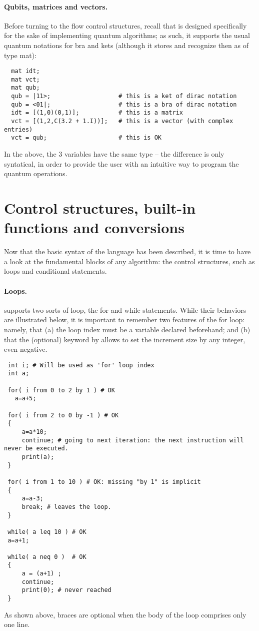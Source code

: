 \paragraph{Qubits, matrices and vectors.} Before turning to the flow control structures, recall that \QL is designed specifically for the sake of implementing quantum algorithms; as such, it supports the usual quantum notations for bra and kets (although it stores and recognize then as of type \textsf{mat}):
\begin{lstlisting}
  mat idt;
  mat vct;
  mat qub;
  qub = |11>;                   # this is a ket of dirac notation
  qub = <01|;                   # this is a bra of dirac notation
  idt = [(1,0)(0,1)];           # this is a matrix
  vct = [(1,2,C(3.2 + 1.I))];   # this is a vector (with complex entries)
  vct = qub;                    # this is OK
\end{lstlisting}
In the above, the 3 variables have the same type -- the difference is only syntatical, in order to provide the user with an intuitive way to program the quantum operations.


\section{Control structures, built-in functions and conversions}
Now that the basic syntax of the language has been described, it is time to have a look at the fundamental blocks of any algorithm: the control structures, such as loops and conditional statements. 

\paragraph{Loops.} \QL supports two sorts of loop, the \textsf{for} and \textsf{while} statements. While their behaviors are illustrated below, it is important to remember two features of the \textsf{for} loop: namely, that \textsf{(a)} the loop index must be a variable declared beforehand; and \textsf{(b)} that the (optional) keyword \textsf{by} allows to set the increment size by any integer, even negative.

\begin{lstlisting}
 int i; # Will be used as 'for' loop index
 int a;

 for( i from 0 to 2 by 1 ) # OK
   a=a+5;

 for( i from 2 to 0 by -1 ) # OK
 {
     a=a*10;
     continue; # going to next iteration: the next instruction will never be executed.
     print(a);
 }
 
 for( i from 1 to 10 ) # OK: missing "by 1" is implicit
 {
     a=a-3;
     break; # leaves the loop.
 }
 
 while( a leq 10 ) # OK
 a=a+1;
 
 while( a neq 0 )  # OK
 {
     a = (a+1) ;
     continue;
     print(0); # never reached
 }
\end{lstlisting}
As shown above, braces are optional when the body of the loop comprises only one line.

